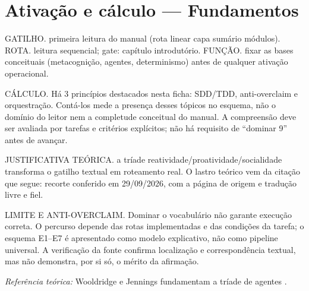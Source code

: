 \section[Ativação e cálculo]{Ativação e cálculo — Fundamentos}

\begin{processo}
GATILHO. primeira leitura do manual (rota linear capa \textrightarrow{} sumário \textrightarrow{} módulos).
ROTA. leitura sequencial; gate: capítulo introdutório.
FUNÇÃO. fixar as bases conceituais (metacognição, agentes, determinismo) antes de qualquer ativação operacional.
\end{processo}

\begin{resultado}
CÁLCULO. Há 3 princípios destacados nesta ficha: SDD/TDD, anti-overclaim e orquestração. Contá-los mede a presença desses tópicos no esquema, não o domínio do leitor nem a completude conceitual do manual. A compreensão deve ser avaliada por tarefas e critérios explícitos; não há requisito de ``dominar 9'' antes de avançar.
\end{resultado}

\begin{descricao}
JUSTIFICATIVA TEÓRICA. a tríade reatividade/proatividade/socialidade transforma o gatilho textual em roteamento real. O lastro teórico vem da citação que segue: recorte conferido em 29/09/2026, com a página de origem e tradução livre e fiel.
\end{descricao}

\begin{aviso}
LIMITE E ANTI-OVERCLAIM. Dominar o vocabulário não garante execução correta.
O percurso depende das rotas implementadas e das condições da tarefa; o esquema
E1--E7 é apresentado como modelo explicativo, não como pipeline universal. A
verificação da fonte confirma localização e correspondência textual, mas não
demonstra, por si só, o mérito da afirmação.
\end{aviso}

\noindent\textit{Referência teórica:} Wooldridge e Jennings fundamentam a tríade de agentes .\par



